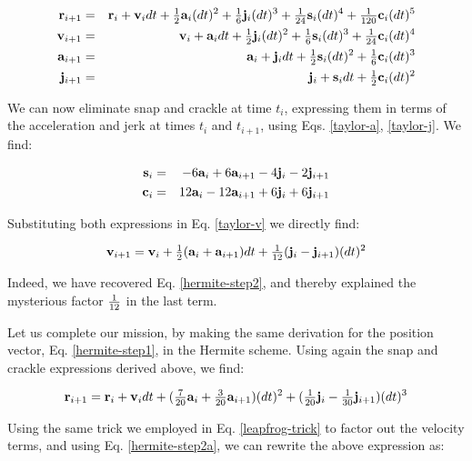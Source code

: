 \begin{eqnarray}
\br_{i+1} & = & \br_i + \bv_i dt + \half\ba_{i}(dt)^2 + \one{6}\bj_{i}(dt)^3
                      + \one{24}\bs_{i}(dt)^4 + \one{120}\bc_{i}(dt)^5
                                                           \label{taylor-r} \\
\bv_{i+1} & = & \bv_i + \ba_i dt + \half\bj_{i}(dt)^2 + \one{6}\bs_{i}(dt)^3
                      + \one{24}\bc_{i}(dt)^4              \label{taylor-v} \\
\ba_{i+1} & = & \ba_i + \bj_i dt + \half\bs_{i}(dt)^2 + \one{6}\bc_{i}(dt)^3
                                                           \label{taylor-a} \\
\bj_{i+1} & = & \bj_i + \bs_i dt + \half\bc_{i}(dt)^2      \label{taylor-j}
\end{eqnarray}

\noindent
We can now eliminate snap and crackle at time $t_i$, expressing them
in terms of the acceleration and jerk at times $t_i$ and $t_{i+1}$,
using Eqs. \ref{taylor-a}, \ref{taylor-j}.  We find:

\begin{eqnarray}
{\bf s}_i &=& -6{\bf a}_i +6{\bf a}_{i+1} -4{\bf j}_i -2{\bf j}_{i+1} \\
{\bf c}_i &=& 12{\bf a}_i -12{\bf a}_{i+1} +6{\bf j}_i +6{\bf j}_{i+1} 
\end{eqnarray}

\noindent
Substituting both expressions in Eq. \ref{taylor-v} we directly find:

\begin{equation}
\bv_{i+1} = \bv_i + \half(\ba_i + \ba_{i+1}) dt +
                \one{12}(\bj_i - \bj_{i+1})(dt)^2 \label{hermite-step2a}
\end{equation}

\noindent
Indeed, we have recovered Eq. \ref{hermite-step2}, and thereby
explained the mysterious factor ${\textstyle\frac{1}{12}}$ in the last term.

Let us complete our mission, by making the same derivation for 
the position vector, Eq. \ref{hermite-step1}, in the Hermite scheme.
Using again the snap and crackle expressions derived above, we find:

\begin{equation}
{\bf r}_{i+1} = {\bf r}_i + {\bf v}_i dt + ({\textstyle\frac{7}{20}}{\bf a}_i + {\textstyle\frac{3}{20}}{\bf a}_{i+1})(dt)^2
            + ({\textstyle\frac{1}{20}}{\bf j}_i - {\textstyle\frac{1}{30}}{\bf j}_{i+1})(dt)^3
\end{equation}

\noindent
Using the same trick we employed in Eq. \ref{leapfrog-trick} to factor
out the velocity terms, and using Eq. \ref{hermite-step2a}, we can
rewrite the above expression as:

